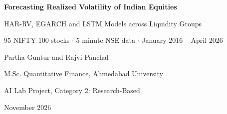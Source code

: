 \documentclass[11pt,a4paper]{article}
\begin{document}
\begin{titlepage}
\centering
\vspace*{2.2cm}
{\LARGE\bfseries Forecasting Realized Volatility of Indian Equities\par}
\vspace{6pt}
{\Large HAR-RV, EGARCH and LSTM Models across Liquidity Groups\par}
\vspace{14pt}
{\large 95 NIFTY 100 stocks $\cdot$ 5-minute NSE data $\cdot$ January 2016 -- April 2026\par}
\vspace{1.6cm}
{\large Partha Guntur \quad and \quad Rajvi Panchal\par}
\vspace{6pt}
M.Sc. Quantitative Finance, Ahmedabad University\par
AI Lab Project, Category 2: Research-Based\par
\vspace{10pt}
November 2026\par
\vspace{1.4cm}
\begin{minipage}{0.9\textwidth}\small\setlength{\parskip}{4pt}

\end{minipage}
\vfill
\end{titlepage}

\tableofcontents
\clearpage









\clearpage
\appendix

\end{document}
